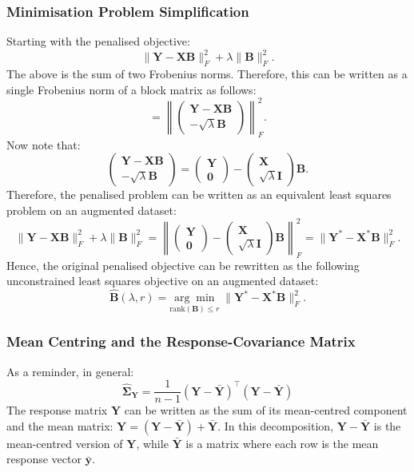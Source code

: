 \documentclass[11pt]{report} %
\begin{document}
\subsubsection{Minimisation Problem Simplification}
\label{Mini Simp}
Starting with the penalised objective:
\[
\| \mathbf{Y} - \mathbf{X} \mathbf{B} \|_F^2 + \lambda \| \mathbf{B} \|_F^2.
\]
The above is the sum of two Frobenius norms. Therefore, this can be written as a single Frobenius norm of a block matrix as follows:
\[
= \left\| 
\begin{pmatrix} 
\mathbf{Y} - \mathbf{X} \mathbf{B} \\ 
- \sqrt{\lambda} \mathbf{B} 
\end{pmatrix} 
\right\|_F^2.
\]
Now note that:
\[
\begin{pmatrix} 
\mathbf{Y} - \mathbf{X} \mathbf{B} \\ 
- \sqrt{\lambda} \mathbf{B} 
\end{pmatrix}
=
\begin{pmatrix}
\mathbf{Y} \\
\mathbf{0}
\end{pmatrix}
-
\begin{pmatrix}
\mathbf{X} \\
\sqrt{\lambda} \mathbf{I}
\end{pmatrix}
\mathbf{B}.
\]
Therefore, the penalised problem can be written as an equivalent least squares problem on an augmented dataset:
\[
\| \mathbf{Y} - \mathbf{X} \mathbf{B} \|_F^2 + \lambda \| \mathbf{B} \|_F^2 
= \left\| 
\begin{pmatrix} 
\mathbf{Y} \\ 
\mathbf{0} 
\end{pmatrix} 
- 
\begin{pmatrix} 
\mathbf{X} \\ 
\sqrt{\lambda} \mathbf{I} 
\end{pmatrix} \mathbf{B} 
\right\|_F^2=\| \mathbf{Y}^* - \mathbf{X}^* \mathbf{B} \|_F^2.
\]
Hence, the original penalised objective can be rewritten as the following unconstrained least squares objective on an augmented dataset:
\[
\hat{\mathbf{B}}(\lambda, r) = \underset{\text{rank}(\mathbf{B}) \leq r}{\arg\min} 
\;\| \mathbf{Y}^* - \mathbf{X}^* \mathbf{B} \|_F^2.
\]

\subsubsection{Mean Centring and the Response-Covariance Matrix}
\label{SVD Cov}
As a reminder, in general:
\[
\mathbf{\hat{\Sigma}_Y}=\frac{1}{n-1}(\mathbf{Y}-\bar{\mathbf{Y}})^\top (\mathbf{Y}-\bar{\mathbf{Y}})
\]
The response matrix \( \mathbf{Y} \) can be written as the sum of its mean-centred component and the mean matrix: $\mathbf{Y} = (\mathbf{Y} - \bar{\mathbf{Y}}) + \bar{\mathbf{Y}}.$
In this decomposition, \( \mathbf{Y} - \bar{\mathbf{Y}} \) is the mean-centred version of \( \mathbf{Y} \), while \( \bar{\mathbf{Y}} \) is a matrix where each row is the mean response vector \( \bar{\mathbf{y}} \).
\end{document}
